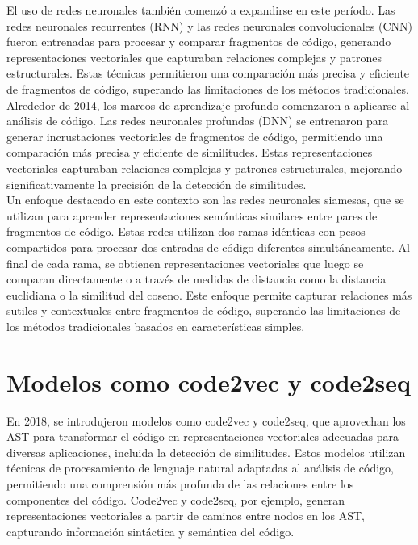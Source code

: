 El uso de redes neuronales también comenzó a expandirse en este período. Las redes neuronales recurrentes (RNN) y las redes neuronales convolucionales (CNN) fueron entrenadas para procesar y comparar fragmentos de código, generando representaciones vectoriales que capturaban relaciones complejas y patrones estructurales. Estas técnicas permitieron una comparación más precisa y eficiente de fragmentos de código, superando las limitaciones de los métodos tradicionales. \\

Alrededor de 2014, los marcos de aprendizaje profundo comenzaron a aplicarse al análisis de código. Las redes neuronales profundas (DNN) se entrenaron para generar incrustaciones vectoriales de fragmentos de código, permitiendo una comparación más precisa y eficiente de similitudes. Estas representaciones vectoriales capturaban relaciones complejas y patrones estructurales, mejorando significativamente la precisión de la detección de similitudes. \\

Un enfoque destacado en este contexto son las redes neuronales siamesas, que se utilizan para aprender representaciones semánticas similares entre pares de fragmentos de código. Estas redes utilizan dos ramas idénticas con pesos compartidos para procesar dos entradas de código diferentes simultáneamente. Al final de cada rama, se obtienen representaciones vectoriales que luego se comparan directamente o a través de medidas de distancia como la distancia euclidiana o la similitud del coseno. Este enfoque permite capturar relaciones más sutiles y contextuales entre fragmentos de código, superando las limitaciones de los métodos tradicionales basados en características simples.


\section*{\textbf{Modelos como code2vec y code2seq}}
En 2018, se introdujeron modelos como code2vec\cite{alon2019code2vec} y code2seq\cite{alon2019code2seq}, que aprovechan los AST para transformar el código en representaciones vectoriales adecuadas para diversas aplicaciones, incluida la detección de similitudes. Estos modelos utilizan técnicas de procesamiento de lenguaje natural adaptadas al análisis de código, permitiendo una comprensión más profunda de las relaciones entre los componentes del código. Code2vec y code2seq, por ejemplo, generan representaciones vectoriales a partir de caminos entre nodos en los AST, capturando información sintáctica y semántica del código.

